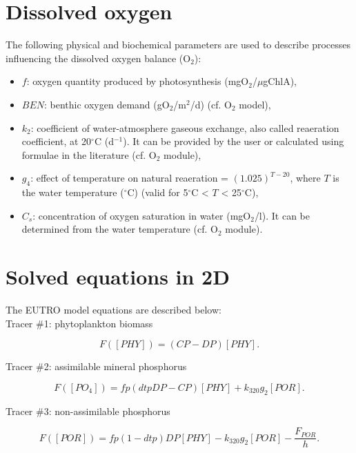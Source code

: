 \section{Dissolved oxygen}

The following physical and biochemical parameters are used to describe processes
influencing the dissolved oxygen balance (O$_2$):

\begin{itemize}
\item $f$: oxygen quantity produced by photosynthesis (mgO$_2$/$\mu$gChlA),
\item $BEN$: benthic oxygen demand (gO$_2$/m$^2$/d) (cf. O$_2$ model),
\item $k_2$: coefficient of water-atmosphere gaseous exchange,
  also called reaeration coefficient, at 20$^{\circ}$C (d$^{-1}$).
  It can be provided by the user or calculated using formulae in the literature (cf. O$_2$ module),
\item $g_4$: effect of temperature on natural reaeration = $(1.025)^{T-20}$,
  where $T$ is the water temperature ($^{\circ}$C) (valid for 5$^{\circ}$C < $T$ < 25$^{\circ}$C),
\item $C_s$: concentration of oxygen saturation in water (mgO$_2$/l).
  It can be determined from the water temperature (cf. O$_2$ module).
\end{itemize}

\section{Solved equations in 2D}

The EUTRO model equations are described below:\\

Tracer $\#$1: phytoplankton biomass

\begin{equation}
  F([PHY]) = (CP-DP) [PHY].
\end{equation}

Tracer $\#$2: assimilable mineral phosphorus

\begin{equation}
  F([PO_4]) = fp(dtp DP - CP) [PHY] + k_{320} g_2 [POR].
\end{equation}

Tracer $\#$3: non-assimilable phosphorus

\begin{equation}
  F([POR]) = fp(1-dtp) DP [PHY] - k_{320} g_2 [POR] - \frac{F_{POR}}{h}.
\end{equation}

